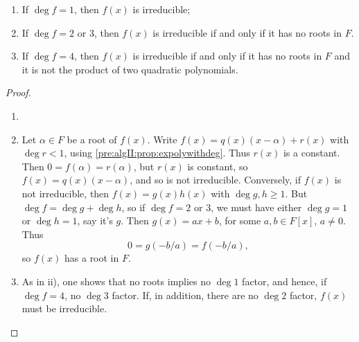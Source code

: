 \documentclass[10pt, a4paper]{article}
\begin{document}
\begin{proposition}\phantom{}
    \begin{enumerate}[label = \roman*)]
        \item If $\deg{f} = 1$,
        then $f(x)$ is irreducible;

        \item If $\deg{f} = 2$ or $3$,
        then $f(x)$ is irreducible if and only if it has no roots in $F$.

        \item If $\deg{f} = 4$,
        then $f(x)$ is irreducible if and only if it has no roots in $F$ and it is not the product of two quadratic polynomials.
    \end{enumerate}

    \begin{proof}\phantom{}
        \begin{enumerate}[label = \roman*)]
            \item 

            \item Let $\alpha \in F$ be a root of $f(x)$.
            Write $f(x) = q(x)(x - \alpha) + r(x)$ with $\deg{r} < 1$,
            using \autoref{pre:algII:prop:expolywithdeg}.
            Thus $r(x)$ is a constant.
            Then $0 = f(\alpha) = r(\alpha)$,
            but $r(x)$ is constant,
            so $f(x) = q(x)(x - \alpha)$,
            and so is not irreducible.
            Conversely,
            if $f(x)$ is not irreducible,
            then $f(x) = g(x)h(x)$ with $\deg{g, h} \geq 1$.
            But $\deg{f} = \deg{g} + \deg{h}$,
            so if $\deg{f} = 2$ or $3$,
            we must have either $\deg{g} = 1$ or $\deg{h} = 1$,
            say it's $g$.
            Then $g(x) = ax + b$,
            for some $a, b \in F[x]$,
            $a \neq 0$.
            Thus
            \[
            0 = g(-b / a) = f(-b / a),
            \]
            so $f(x)$ has a root in $F$.

            \item As in ii),
            one shows that no roots implies no $\deg{1}$ factor,
            and hence,
            if $\deg{f} = 4$,
            no $\deg{3}$ factor.
            If,
            in addition,
            there are no $\deg{2}$ factor,
            $f(x)$ must be irreducible.
        \end{enumerate}
    \end{proof}
\end{proposition}
\end{document}
